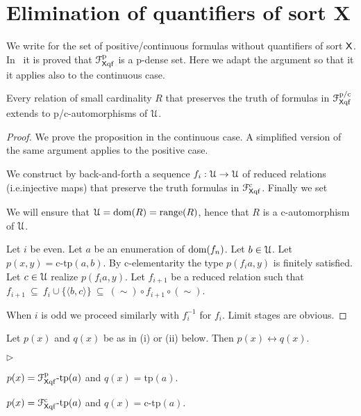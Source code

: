 \documentclass{amsproc}
\newcommand{\mylabel}[1]{{#1}\hfill}
\renewenvironment{itemize}
  {\begin{list}{$\triangleright$}{%
  \setlength{\parskip}{0mm}
  \setlength{\topsep}{.4\baselineskip}
  \setlength{\rightmargin}{0mm}
  \setlength{\listparindent}{0mm}
  \setlength{\itemindent}{0mm}
  \setlength{\labelwidth}{3ex}
  \setlength{\itemsep}{.2\baselineskip}
  \setlength{\parsep}{.2\baselineskip}
  \setlength{\partopsep}{0mm}
  \setlength{\labelsep}{1ex}
  \setlength{\leftmargin}{\labelwidth+\labelsep}
  \let\makelabel\mylabel}}{%
\end{list}}
\renewcommand*{\emph}[1]{%
   \smash{\tikz[baseline]\node[rectangle, fill=teal!25, rounded corners, inner xsep=0.5ex, inner ysep=0.2ex, anchor=base, minimum height = 2.7ex]{\strut #1};}}
\begin{document}
{%
\section{Elimination of quantifiers of sort \textsf{X}}\label{cIelimination}

We write \emph{${\EuScript F}^{\rm p/c}_{{\sf X}{\rm qf}}$} for the set of positive/continuous formulas without quantifiers of sort ${\sf X}$.
In~\cite{clcl} it is proved that ${\EuScript F}^{\rm p}_{{\sf X}{\rm qf}}$ is a p-dense set.
Here we adapt the argument so that it it applies also to the continuous case.

\begin{proposition}\label{prop_Iqf_elim}
  Every relation of small cardinality $R$ that preserves the truth of formulas in ${\EuScript F}^{\rm p/c}_{{\sf X}{\rm qf}}$ extends to p/c-automorphisms of ${\EuScript U}$.
\end{proposition}

\begin{proof}
  We prove the proposition in the continuous case.
  A simplified version of the same argument applies to the positive case.

  We construct by back-and-forth a sequence $f_i:{\EuScript U}\rightarrow{\EuScript U}$ of reduced relations (i.e.\@ injective maps) that preserve the truth formulas in ${\EuScript F}^{\rm c}_{{\sf X}{\rm qf}}$.
  Finally we set 
  

  We will ensure that ${\EuScript U}={\rm dom}(R)={\rm range}(R)$, hence that $R$ is a c-automorphism of ${\EuScript U}$.

  Let $i$ be even.
  Let $a$ be an enumeration of ${\rm dom}(f_n)$.
  Let $b\in{\EuScript U}$. 
  Let $p(x,y)=\mbox{c-tp}(a,b)$.
  By c-elementarity the type $p(f_ia,y)$ is finitely satisfied.
  Let $c\in{\EuScript U}$ realize $p(f_ia,y)$.
  Let $f_{i+1}$ be a reduced relation such that $f_{i+1}\ \subseteq\ f_i\cup\{\langle b,c\rangle\}\ \subseteq\ (\sim)\circ f_{i+1}\circ(\sim)$.

  When $i$ is odd we proceed similarly with $f_i^{-1}$ for $f_i$.
  Limit stages are obvious.
\end{proof}

\begin{corollary}\label{corol_cLcomplete}
  Let $p(x)$ and $q(x)$ be as in (i) or (ii) below.
  Then $p(x)\leftrightarrow q(x)$.
  \begin{itemize}
    \item[i.] $p(x)={\EuScript F}^{\rm p}_{{\sf X}{\rm qf}}\mbox{-tp}(a)$ and $q(x)=\mbox{tp}(a)$.
    \item[ii.] $p(x)={\EuScript F}^{\rm c}_{{\sf X}{\rm qf}}\mbox{-tp}(a)$ and $q(x)=\mbox{c-tp}(a)$.
  \end{itemize}
\end{corollary}

}
\end{document}
